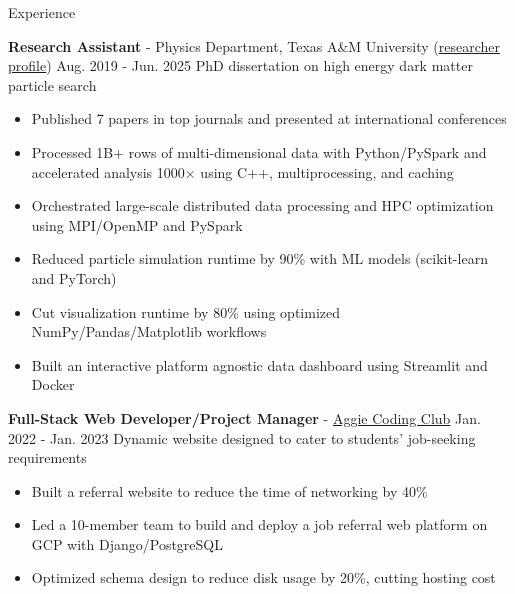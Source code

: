\documentclass{resume}
\begin{document}
\begin{rSection}{Experience}
    \item \textbf{Research Assistant} - Physics Department, Texas A\&M University (\href{https://inspirehep.net/authors/2661451}{researcher profile}) \hfill Aug. 2019 - Jun. 2025
        \newline\hspace*{0.5em} {\normalsize PhD dissertation on high energy dark matter particle search}
        \begin{itemize}
        \item Published 7 papers in top journals and presented at international conferences
        \item Processed 1B+ rows of multi-dimensional data with Python/PySpark and accelerated analysis 1000× using C++, multiprocessing, and caching
        \item Orchestrated large-scale distributed data processing and HPC optimization using MPI/OpenMP and PySpark
        \item Reduced particle simulation runtime by 90\% with ML models (scikit-learn and PyTorch)
        \item Cut visualization runtime by 80\% using optimized NumPy/Pandas/Matplotlib workflows
        \item Built an interactive platform agnostic data dashboard using Streamlit and Docker
        \end{itemize}

    \item \textbf{Full-Stack Web Developer/Project Manager} - \href{https://aggiecodingclub.com}{Aggie Coding Club} \hfill Jan. 2022 - Jan. 2023
        \newline\hspace*{0.5em} {\normalsize Dynamic website designed to cater to students' job-seeking requirements}
        \begin{itemize}
        \item Built a referral website to reduce the time of networking by 40\%
        \item Led a 10-member team to build and deploy a job referral web platform on GCP with Django/PostgreSQL
        \item Optimized schema design to reduce disk usage by 20\%, cutting hosting cost
        \end{itemize}

\end{rSection}
\end{document}
